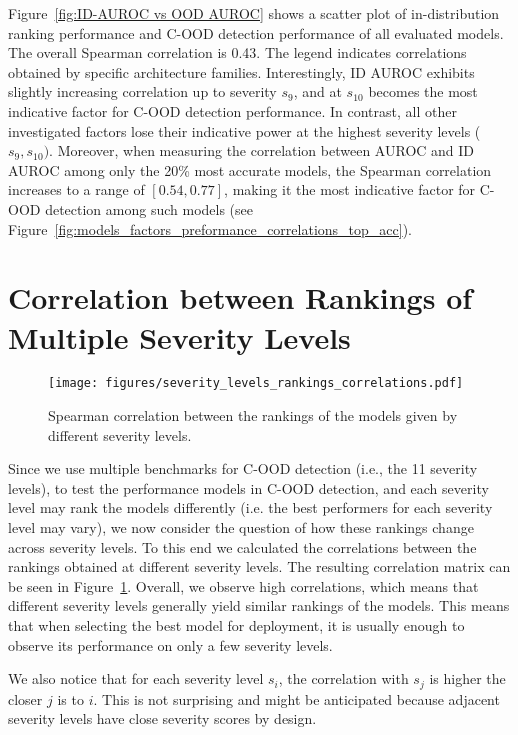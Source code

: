 \documentclass[table]{article} \usepackage{PRIMEarxiv}
\begin{document}
Figure~\ref{fig:ID-AUROC vs OOD AUROC} shows a scatter plot of in-distribution ranking performance and C-OOD detection performance of all evaluated models. The overall Spearman correlation is 0.43. The legend indicates correlations obtained by specific architecture families. 
Interestingly, ID AUROC exhibits slightly increasing correlation up to severity
$s_9$, and at $s_{10}$ becomes the most indicative factor for C-OOD detection performance.
In contrast, all other investigated factors lose their indicative power at the highest severity levels ($s_9, s_{10})$.
Moreover, when measuring the correlation between AUROC and ID AUROC among only the 20\% most accurate models, the Spearman correlation increases to a range of $[0.54, 0.77]$, making it the most indicative factor for C-OOD detection among such models (see Figure~\ref{fig:models_factors_preformance_correlations_top_acc}).

\section{Correlation between Rankings of Multiple Severity Levels}
\label{sec:rankings of sevl}

\begin{figure}[h]
    \centering
    \texttt{[image: figures/severity\_levels\_rankings\_correlations.pdf]}
    \caption{Spearman correlation between the rankings of the models given by different severity levels.
    }
    \label{fig:models_rankings_correlations}
\end{figure}
Since we use multiple benchmarks for C-OOD detection 
(i.e., the 11 severity levels), to test the performance models in C-OOD detection, and each severity level may rank the models differently (i.e. the best performers for each severity level may vary), we now consider 
the question of how  these rankings change across severity levels.
To this end we calculated the correlations between the rankings obtained at different severity levels. The resulting correlation matrix can be seen in Figure~\ref{fig:models_rankings_correlations}. Overall, we observe high correlations, which means that different severity levels generally yield similar rankings of the models. 
This means that when selecting the best model for deployment, it is usually enough to observe its performance on only a few severity levels.

We also notice that for each severity level $s_i$, the correlation with
$s_j$ is higher the closer $j$ is to $i$.
This is not surprising and might be anticipated 
because adjacent severity levels have close severity scores by design.
\end{document}
